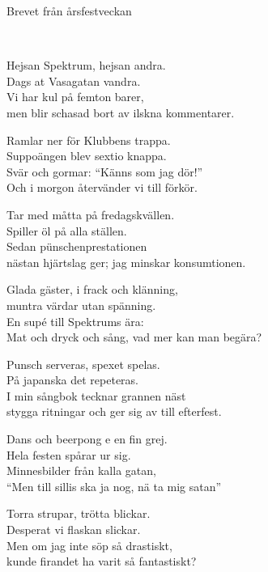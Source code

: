 \begin{song}{Brevet från årsfestveckan}
	
	\\
	

    \showversenumber	
	Hejsan Spektrum, hejsan andra.\\
	Dags at Vasagatan vandra.\\
	Vi har kul på femton barer,\\
	men blir schasad bort av ilskna kommentarer.

	\showversenumber	
	Ramlar ner för Klubbens trappa.\\
	Suppoängen blev sextio knappa.\\
	Svär och gormar: ``Känns som jag dör!''\\
	Och i morgon återvänder vi till förkör.

	\showversenumber	
	Tar med måtta på fredagskvällen.\\
	Spiller öl på alla ställen.\\
	Sedan pünschenprestationen\\
	nästan hjärtslag ger; jag minskar konsumtionen.

	\showversenumber	
	Glada gäster, i frack och klänning,\\
	muntra värdar utan spänning.\\
	En supé till Spektrums ära:\\
	Mat och dryck och sång, vad mer kan man begära?

	\showversenumber	
	Punsch serveras, spexet spelas.\\
	På japanska det repeteras.\\
	I min sångbok tecknar grannen näst\\
	stygga ritningar och ger sig av till efterfest.

	\showversenumber	
	Dans och beerpong e en fin grej.\\
	Hela festen spårar ur sig.\\
	Minnesbilder från kalla gatan,\\
	``Men till sillis ska ja nog, nä ta mig satan''
	
	\showversenumber
	Torra strupar, trötta blickar.\\
	Desperat vi flaskan slickar.\\
	Men om jag inte söp så drastiskt,\\
	kunde firandet ha varit så fantastiskt?

	
\end{song}
